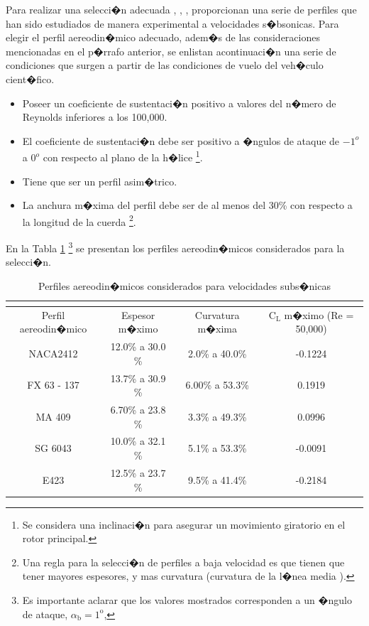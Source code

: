 \documentclass[10pt,a4paper]{book}
\begin{document}
Para realizar una  selecci�n adecuada \cite{PerfilMejor}, \cite{Doenhoff}, \cite{LowSpeed},  proporcionan una serie de perfiles que han sido estudiados de manera experimental a velocidades s�bsonicas. Para elegir el perfil aereodin�mico adecuado, adem�s de las consideraciones mencionadas en el p�rrafo anterior, se enlistan acontinuaci�n una serie de condiciones que surgen a partir de las condiciones de vuelo del veh�culo cient�fico. 
\begin{itemize}
\item Poseer un coeficiente de sustentaci�n positivo a valores del n�mero de Reynolds inferiores a los 100,000.
\item El coeficiente de sustentaci�n debe ser positivo a �ngulos de ataque de $-1^{o}$ a $0^{o}$ con respecto al plano de la h�lice \footnote{Se considera una inclinaci�n para asegurar un movimiento giratorio en el rotor principal.}.
\item Tiene  que ser un perfil asim�trico.
\item La anchura m�xima del perfil debe ser de al menos del 30\% con respecto a la longitud de la cuerda \footnote{Una regla para la selecci�n de perfiles a baja velocidad es que tienen que tener mayores espesores, y mas curvatura (curvatura de la l�nea media \cite{Doenhoff}).}. 
\end{itemize}

En la Tabla \ref{Perfiles} \footnote{Es importante aclarar que los valores mostrados corresponden a un �ngulo de ataque, $\alpha_{\text{b}} = 1^{\text{o}}$,} se presentan los perfiles aereodin�micos considerados para la selecci�n. 

\begin{table}[H]
\begin{center}
\caption{Perfiles aereodin�micos considerados para velocidades subs�nicas}
\label{Perfiles}
\resizebox{13cm}{!} {
\begin{tabular}{m{4cm}m{3cm}m{3cm}m{4cm}}
\multicolumn{4}{c}{}\tabularnewline
\toprule
\multicolumn{1}{c}{Perfil aereodin�mico} & \multicolumn{1}{c}{Espesor m�ximo} & \multicolumn{1}{c}{Curvatura m�xima} & \multicolumn{1}{c}{$\text{C}_{\text{L}}$ m�ximo (Re = 50,000)}\tabularnewline
\multicolumn{1}{c}{NACA2412} & \multicolumn{1}{c}{12.0\% a 30.0 \% } &\multicolumn{1}{c}{2.0\% a 40.0\% }& \multicolumn{1}{c}{-0.1224} \tabularnewline
\multicolumn{1}{c}{FX 63 - 137} & \multicolumn{1}{c}{13.7\% a 30.9 \% } &\multicolumn{1}{c}{6.00\% a 53.3\% }& \multicolumn{1}{c}{0.1919} \tabularnewline
\multicolumn{1}{c}{MA 409} & \multicolumn{1}{c}{6.70\% a 23.8 \% } &\multicolumn{1}{c}{3.3\% a 49.3\% }& \multicolumn{1}{c}{0.0996} \tabularnewline
\multicolumn{1}{c}{SG 6043} & \multicolumn{1}{c}{10.0\% a 32.1 \% } &\multicolumn{1}{c}{5.1\% a 53.3\% }& \multicolumn{1}{c}{-0.0091} \tabularnewline
\multicolumn{1}{c}{E423} & \multicolumn{1}{c}{12.5\% a 23.7 \% } &\multicolumn{1}{c}{9.5\% a 41.4\% }& \multicolumn{1}{c}{-0.2184} \tabularnewline
\bottomrule
\end{tabular}
}
\end{center}
\end{table}
\end{document}
